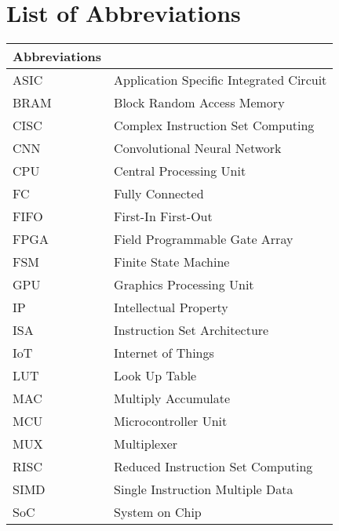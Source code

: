 


\clearpage
\pagestyle{headings}

\chapter[List of Abbreviations ]{List of Abbreviations}


\begin{center}
	\small
	\begin{longtable}{ll}
	\toprule
	Abbreviations & {} \\
	\bottomrule
	ASIC		    & Application Specific Integrated Circuit \\
	BRAM			& Block Random Access Memory \\
	CISC			& Complex Instruction Set Computing \\
	CNN				& Convolutional Neural Network \\
	CPU				& Central Processing Unit \\
    FC				& Fully Connected \\
	FIFO			& First-In First-Out \\
	FPGA			& Field Programmable Gate Array \\
	FSM				& Finite State Machine \\
    GPU				& Graphics Processing Unit \\
	IP				& Intellectual Property \\
	ISA				& Instruction Set Architecture \\
	IoT				& Internet of Things \\
	LUT 			& Look Up Table \\
	MAC				& Multiply Accumulate \\
	MCU  	        & Microcontroller Unit \\
    MUX				& Multiplexer \\
    RISC			& Reduced Instruction Set Computing \\
    SIMD			& Single Instruction Multiple Data \\
	SoC				& System on Chip \\
	\hline 
	\end{longtable}
\end{center}
\clearpage

